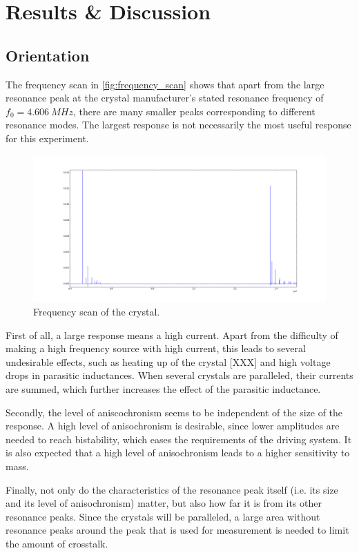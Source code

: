 \section{Results \& Discussion}

\subsection{Orientation}
The frequency scan in \autoref{fig:frequency_scan} shows that apart from the large resonance peak at the crystal manufacturer's stated resonance frequency of $f_0 = \SI{4.606}{MHz}$, there are many smaller peaks corresponding to different resonance modes. The largest response is not necessarily the most useful response for this experiment. 

\begin{figure}
	\centering
		\includegraphics[width=\textwidth]{figures/frequency_scan.png}
	\caption{Frequency scan of the crystal.}
	\label{fig:frequency_scan}
\end{figure}

First of all, a large response means a high current. Apart from the difficulty of making a high frequency source with high current, this leads to several undesirable effects, such as heating up of the crystal [XXX] and high voltage drops in parasitic inductances. When several crystals are paralleled, their currents are summed, which further increases the effect of the parasitic inductance. 

Secondly, the level of aniscochronism seems to be independent of the size of the response. A high level of anisochronism is desirable, since lower amplitudes are needed to reach bistability, which eases the requirements of the driving system. It is also expected that a high level of anisochronism leads to a higher sensitivity to mass. 

Finally, not only do the characteristics of the resonance peak itself (i.e. its size and its level of anisochronism) matter, but also how far it is from its other resonance peaks. Since the crystals will be paralleled, a large area without resonance peaks around the peak that is used for measurement is needed to limit the amount of crosstalk. 

